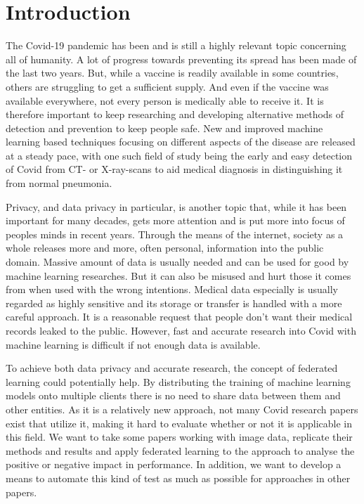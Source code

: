 \section{Introduction}

The Covid-19 pandemic has been and is still a highly relevant topic concerning all of humanity. A lot of progress towards preventing its spread has been made of the last two years. But, while a vaccine is readily available in some countries, others are struggling to get a sufficient supply. And even if the vaccine was available everywhere, not every person is medically able to receive it. It is therefore important to keep researching and developing alternative methods of detection and prevention to keep people safe. New and improved machine learning based techniques focusing on different aspects of the disease are released at a steady pace, with one such field of study being the early and easy detection of Covid from CT- or X-ray-scans to aid medical diagnosis in distinguishing it from normal pneumonia.

Privacy, and data privacy in particular, is another topic that, while it has been important for many decades, gets more attention and is put more into focus of peoples minds in recent years. Through the means of the internet, society as a whole releases more and more, often personal, information into the public domain. Massive amount of data is usually needed and can be used for good by machine learning researches. But it can also be misused and hurt those it comes from when used with the wrong intentions.
Medical data especially is usually regarded as highly sensitive and its storage or transfer is handled with a more careful approach. It is a reasonable request that people don't want their medical records leaked to the public. However, fast and accurate research into Covid with machine learning is difficult if not enough data is available. 

To achieve both data privacy and accurate research, the concept of federated learning could potentially help. By distributing the training of machine learning models onto multiple clients there is no need to share data between them and other entities. As it is a relatively new approach, not many Covid research papers exist that utilize it, making it hard to evaluate whether or not it is applicable in this field. We want to take some papers working with image data, replicate their methods and results and apply federated learning to the approach to analyse the positive or negative impact in performance. In addition, we want to develop a means to automate this kind of test as much as possible for approaches in other papers. 

